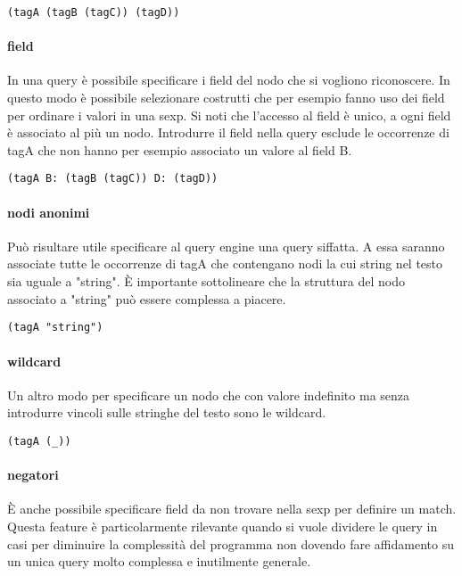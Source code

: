 \begin{lstlisting}
(tagA (tagB (tagC)) (tagD))
\end{lstlisting}

\paragraph{field}

In una query \`e possibile specificare i field del nodo che si vogliono riconoscere.
In questo modo \`e possibile selezionare costrutti che per esempio fanno uso dei field per ordinare i valori in una sexp.
Si noti che l'accesso al field \`e unico, a ogni field \`e associato al pi\`u un nodo.
Introdurre il field nella query esclude le occorrenze di tagA che non hanno per esempio associato un valore al field B.

\begin{lstlisting}
(tagA B: (tagB (tagC)) D: (tagD))
\end{lstlisting}

\paragraph{nodi anonimi}

Pu\`o risultare utile specificare al query engine una query siffatta.
A essa saranno associate tutte le occorrenze di tagA che contengano nodi la cui string nel testo sia uguale a "string".
\`E importante sottolineare che la struttura del nodo associato a "string" pu\`o essere complessa a piacere.

\begin{lstlisting}
(tagA "string")
\end{lstlisting}

\paragraph{wildcard}

Un altro modo per specificare un nodo che con valore indefinito ma senza introdurre vincoli sulle stringhe del testo sono le wildcard.

\begin{lstlisting}
(tagA (_))
\end{lstlisting}

\paragraph{negatori}

\`E anche possibile specificare field da non trovare nella sexp per definire un match.
Questa feature \`e particolarmente rilevante quando si vuole dividere le query in casi per diminuire la complessit\`a del programma non dovendo fare affidamento su un unica query molto complessa e inutilmente generale.

